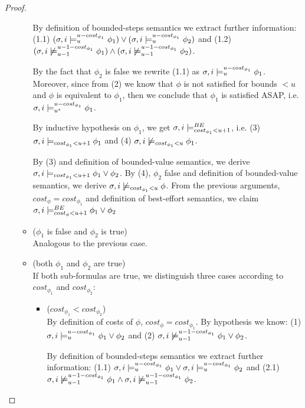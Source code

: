 \begin{theorem}
\begin{proof}
\begin{itemize}
\begin{itemize}
         By definition of bounded-steps semantics we extract further information: 
         (1.1) $(\sigma,i \models_{u}^{u-cost_{\phi_1}} \phi_1) \lor (\sigma, i\models_{u}^{u-cost_{\phi_1}} \phi_2)$ and 
         (1.2)$(\sigma,i \not\models_{u-1}^{u-1-cost_{\phi_1}} \phi_1) \land (\sigma,i \not\models_{u-1}^{u-1-cost_{\phi_1}} \phi_2)$.

         By the fact that $\phi_2$ is false we rewrite (1.1) as $\sigma,i \models_{u}^{u-cost_{\phi_1}} \phi_1$.
         Moreover, since from (2) we know that $\phi$ is not satisfied for bounds $< u$ and $\phi$ is equivalent to $\phi_1$, then we conclude that $\phi_1$ is satisfied ASAP, i.e. $\sigma,i \models_{{u}^*}^{u-cost_{\phi_1}} \phi_1$.

         By inductive hypothesis on $\phi_1$, we get $\sigma,i \models_{cost_{\phi_1} < u + 1}^{BE}$, i.e. (3) $\sigma,i \models_{cost_{\phi_1} < u + 1} \phi_1$ and (4) $\sigma,i \not\models_{cost_{\phi_1} < u} \phi_1$.

         By (3) and definition of bounded-value semantics, we derive $\sigma,i \models_{cost_{\phi_1} < u + 1} \phi_1 \lor \phi_2$.
         By (4), $\phi_2$ false and definition of bounded-value semantics, we derive $\sigma,i \not\models_{cost_{\phi_1} < u} \phi$.
         From the previous arguments, $cost_\phi = cost_{\phi_1}$ and definition of best-effort semantics, we claim $\sigma,i \models_{cost_\phi < u + 1}^{BE} \phi_1 \lor \phi_2$

         \item ($\phi_1$ is false and $\phi_2$ is true) \\
         Analogous to the previous case.

         \item (both $\phi_1$ and $\phi_2$ are true) \\
         If both sub-formulas are true, we distinguish three cases according to $cost_{\phi_1}$ and $cost_{\phi_2}$:
         \begin{itemize}
             \item ($cost_{\phi_1} < cost_{\phi_2}$) \\
             By definition of costs of $\phi$, $cost_\phi = cost_{\phi_1}$.
             By hypothesis we know: 
             (1) $\sigma, i \models_{u}^{u-cost_{\phi_1}} \phi_1 \lor \phi_2$ and
             (2) $\sigma, i \not\models_{u-1}^{u-1-cost_{\phi_1}} \phi_1 \lor \phi_2$.

             By definition of bounded-steps semantics we extract further information:
             (1.1) $\sigma,i \models_{u}^{u-cost_{\phi_1}} \phi_1 \lor \sigma,i \models_{u}^{u-cost_{\phi_1}} \phi_2$ and 
             (2.1) $\sigma,i \not\models_{u-1}^{u-1-cost_{\phi_1}} \phi_1 \land \sigma,i \not\models_{u-1}^{u-1-cost_{\phi_1}} \phi_2$.


\end{itemize}
\end{itemize}
\end{itemize}
\end{proof}
\end{theorem}
